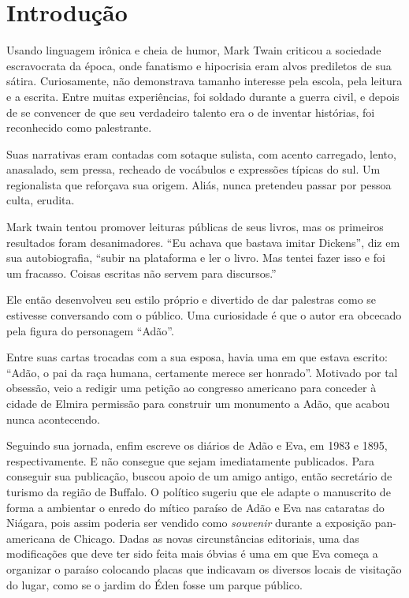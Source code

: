 \documentclass[12pt]{extarticle}
\begin{document}
\section{Introdução}

Usando linguagem irônica e cheia de humor, Mark Twain 
criticou a sociedade escravocrata da época, 
onde fanatismo e hipocrisia eram alvos prediletos de sua sátira.
Curiosamente, não demonstrava tamanho interesse pela escola, pela leitura e a escrita.
Entre muitas experiências, foi soldado durante a guerra civil, 
e depois de se convencer de que seu verdadeiro talento era 
o de inventar histórias, foi reconhecido como palestrante.

Suas narrativas eram contadas com sotaque sulista, 
com acento carregado, lento, anasalado, sem pressa, 
recheado de vocábulos e expressões típicas do sul.
Um regionalista que reforçava sua origem.
Aliás, nunca pretendeu passar por pessoa culta, erudita.

Mark twain tentou promover leituras públicas de seus livros, 
mas os primeiros resultados foram desanimadores. 
“Eu achava que bastava imitar Dickens”, diz em sua autobiografia, 
“subir na plataforma e ler o livro. Mas tentei fazer isso e foi um fracasso. 
Coisas escritas não servem para discursos.” 

Ele então desenvolveu seu estilo próprio e 
divertido de dar palestras como se estivesse conversando com o público.
Uma curiosidade é que o autor era obcecado pela figura do personagem ``Adão''.

Entre suas cartas trocadas com a sua esposa, 
havia uma em que estava escrito: “Adão, o pai da raça humana, certamente 
merece ser honrado”.
Motivado por tal obsessão, veio a redigir uma petição ao congresso americano 
para conceder à cidade de Elmira permissão para 
construir um monumento a Adão, que acabou nunca acontecendo.

Seguindo sua jornada, enfim escreve os diários de Adão e Eva, 
em 1983 e 1895, respectivamente. E não consegue que sejam imediatamente publicados.
Para conseguir sua publicação, buscou apoio de um amigo antigo, 
então secretário de turismo da região de Buffalo.
O político sugeriu que ele adapte o manuscrito de forma a 
ambientar o enredo do mítico paraíso de Adão e Eva nas cataratas do Niágara, 
pois assim poderia ser vendido como \textit{souvenir} durante a exposição 
pan-americana de Chicago.
Dadas as novas circunstâncias editoriais, uma das modificações que 
deve ter sido feita mais óbvias é uma em que Eva começa a organizar 
o paraíso colocando placas que indicavam os diversos locais de visitação 
do lugar, como se o jardim do Éden fosse um parque público.
\end{document}
